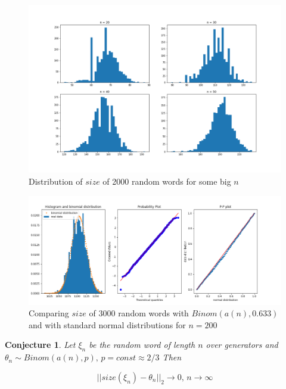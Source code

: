 \documentclass[a4paper,12pt]{amsart}
\newtheorem{hypothesis}{Conjecture}
\begin{document}


\begin{figure}[h]
	\includegraphics[scale=0.4]{size_distribution2.png}
	\caption{Distribution of $size$ of 2000 random words for some big $n$}
	\label{figure:dist-big}
\end{figure}


\begin{figure}[h]
	\raggedleft
	\includegraphics[scale=0.5]{size_with_binomial.png}
	\caption{Comparing $size$ of 3000 random words with $Binom(a(n), 0.633)$ and with standard normal distributions for $n = 200$}
	\label{figure:comparing}
\end{figure}


\begin{hypothesis}
	Let $\xi_n$ be the random word of length $n$ over generators and $\theta_n \sim Binom(a(n), p), \, p = const \approx 2/3$ Then 
	
	$$||size(\xi_n) - \theta_n||_2 \rightarrow 0, \, n \rightarrow \infty$$
\end{hypothesis}
\end{document}
